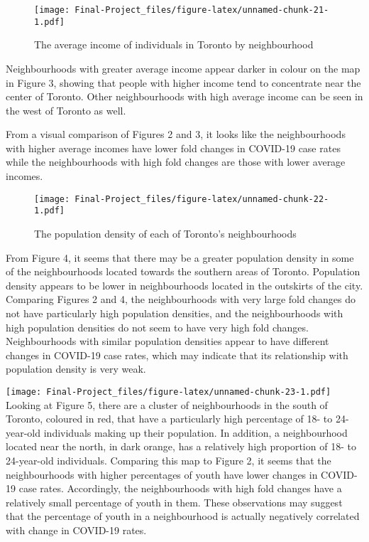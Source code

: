 \documentclass[]{article}
\begin{document}
\begin{figure}
\centering
\texttt{[image: Final-Project\_files/figure-latex/unnamed-chunk-21-1.pdf]}
\caption{The average income of individuals in Toronto by neighbourhood}
\end{figure}

Neighbourhoods with greater average income appear darker in colour on
the map in Figure 3, showing that people with higher income tend to
concentrate near the center of Toronto. Other neighbourhoods with high
average income can be seen in the west of Toronto as well.

From a visual comparison of Figures 2 and 3, it looks like the
neighbourhoods with higher average incomes have lower fold changes in
COVID-19 case rates while the neighbourhoods with high fold changes are
those with lower average incomes.

\begin{figure}
\centering
\texttt{[image: Final-Project\_files/figure-latex/unnamed-chunk-22-1.pdf]}
\caption{The population density of each of Toronto's neighbourhoods}
\end{figure}

From Figure 4, it seems that there may be a greater population density
in some of the neighbourhoods located towards the southern areas of
Toronto. Population density appears to be lower in neighbourhoods
located in the outskirts of the city. Comparing Figures 2 and 4, the
neighbourhoods with very large fold changes do not have particularly
high population densities, and the neighbourhoods with high population
densities do not seem to have very high fold changes. Neighbourhoods
with similar population densities appear to have different changes in
COVID-19 case rates, which may indicate that its relationship with
population density is very weak.

\texttt{[image: Final-Project\_files/figure-latex/unnamed-chunk-23-1.pdf]}
Looking at Figure 5, there are a cluster of neighbourhoods in the south
of Toronto, coloured in red, that have a particularly high percentage of
18- to 24-year-old individuals making up their population. In addition,
a neighbourhood located near the north, in dark orange, has a relatively
high proportion of 18- to 24-year-old individuals. Comparing this map to
Figure 2, it seems that the neighbourhoods with higher percentages of
youth have lower changes in COVID-19 case rates. Accordingly, the
neighbourhoods with high fold changes have a relatively small percentage
of youth in them. These observations may suggest that the percentage of
youth in a neighbourhood is actually negatively correlated with change
in COVID-19 rates.
\end{document}
